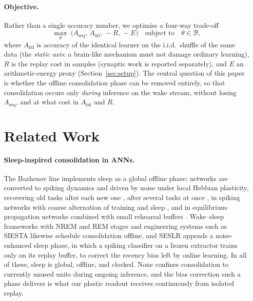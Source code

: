 \documentclass{article}
\begin{document}
\paragraph{Objective.}
Rather than a single accuracy number, we optimise a four-way trade-off
\begin{equation}
\max_\theta \;\big(A_{\mathrm{seq}},\, A_{\mathrm{iid}},\, -R,\, -E\big)
\quad\text{subject to}\quad \theta \in \mathcal{B},
\label{eq:pareto}
\end{equation}
where $A_{\mathrm{iid}}$ is accuracy of the identical learner on the i.i.d.\ shuffle of the same
data (the \emph{static axis}: a brain-like mechanism must not damage ordinary learning), $R$ is
the replay cost in samples (synaptic work is reported separately), and $E$ an arithmetic-energy proxy
(Section~\ref{sec:setup}). The central question of this paper is whether the offline
consolidation phase can be removed entirely, so that consolidation occurs only \emph{during}
inference on the wake stream, without losing $A_{\mathrm{seq}}$, and at what cost in
$A_{\mathrm{iid}}$ and $R$.

\section{Related Work}
\label{sec:related}

\paragraph{Sleep-inspired consolidation in ANNs.}
The Bazhenov line implements sleep as a global offline phase: networks are converted to spiking
dynamics and driven by noise under local Hebbian plasticity, recovering old tasks after each new
one \citep{tadros2022}, after several tasks at once \citep{bazhenov2026}, in spiking networks with
coarse alternation of training and sleep \citep{golden2022}, and in equilibrium-propagation
networks combined with small rehearsal buffers \citep{kubo2025}. Wake--sleep frameworks with NREM
and REM stages \citep{sorrenti2024,robinson2022} and engineering systems such as SIESTA
\citep{harun2023} likewise schedule consolidation offline, and SESLR \citep{lin2026} appends a
noise-enhanced sleep phase, in which a spiking classifier on a frozen extractor trains only
on its replay buffer, to correct the recency bias left by online learning. In all of these,
sleep is global, offline, and clocked. None confines consolidation to currently unused units
during ongoing inference, and the bias correction such a phase delivers is what our plastic
readout receives continuously from isolated replay.
\end{document}
